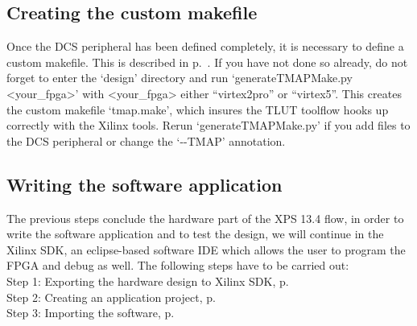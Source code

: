 \documentclass[a4paper,oneside]{memoir}
\begin{document}
\subsection{Creating the custom makefile}\label{sec:creating_makefile_blaze}

Once the DCS peripheral has been defined completely, it is necessary to define a custom makefile. This is described in p.\ \pageref{sec:creating_makefile}. If you have not done so already, do not forget to enter the `design' directory and run `generateTMAPMake.py <your\_fpga>' with <your\_fpga> either ``virtex2pro'' or ``virtex5''. This creates the custom makefile `tmap.make', which insures the TLUT toolflow hooks up correctly with the Xilinx tools. Rerun `generateTMAPMake.py' if you add files to the DCS peripheral or change the `-\--TMAP' annotation.

\subsection{Writing the software application}

The previous steps conclude the hardware part of the XPS 13.4 flow, in order to write the software application and to test the design, we will continue in the Xilinx SDK, an eclipse-based software IDE which allows the user to program the FPGA and debug as well. The following steps have to be carried out:
\\   
Step 1: Exporting the hardware design to Xilinx SDK, p.\ \pageref{sec:expot_sdk_blaze}\\
Step 2: Creating an application project, p.\ \pageref{sec:creating_application_blaze}\\
Step 3: Importing the software, p.\ \pageref{sec:import_software_blaze}\\
\end{document}
